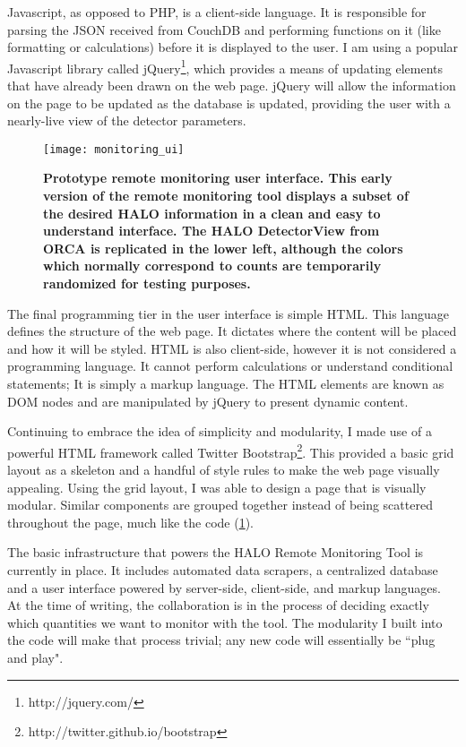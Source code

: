 		Javascript, as opposed to PHP, is a client-side language. It is responsible for parsing the JSON received from CouchDB and performing functions on it (like formatting or calculations) before it is displayed to the user. I am using a popular Javascript library called jQuery\footnote{http://jquery.com/}, which provides a means of updating elements that have already been drawn on the web page. jQuery will allow the information on the page to be updated as the database is updated, providing the user with a nearly-live view of the detector parameters. 

		\begin{figure}[H]
			\texttt{[image: monitoring\_ui]}
			\caption[Prototype Remote Monitoring User Interface]{\bf Prototype remote monitoring user interface. \rm This early version of the remote monitoring tool displays a subset of the desired HALO information in a clean and easy to understand interface. The HALO DetectorView from ORCA is replicated in the lower left, although the colors which normally correspond to counts are temporarily randomized for testing purposes.}
			\label{fig:mon_ui}
		\end{figure}

		The final programming tier in the user interface is simple HTML. This language defines the structure of the web page. It dictates where the content will be placed and how it will be styled. HTML is also client-side, however it is not considered a programming language. It cannot perform calculations or understand conditional statements; It is simply a markup language. The HTML elements are known as DOM nodes and are manipulated by jQuery to present dynamic content.

		Continuing to embrace the idea of simplicity and modularity, I made use of a powerful HTML framework called Twitter Bootstrap\footnote{http://twitter.github.io/bootstrap}. This provided a basic grid layout as a skeleton and a handful of style rules to make the web page visually appealing. Using the grid layout, I was able to design a page that is visually modular. Similar components are grouped together instead of being scattered throughout the page, much like the code (\FIG \ref{fig:mon_ui}). 

		The basic infrastructure that powers the HALO Remote Monitoring Tool is currently in place. It includes automated data scrapers, a centralized database and a user interface powered by server-side, client-side, and markup languages. At the time of writing, the collaboration is in the process of deciding exactly which quantities we want to monitor with the tool. The modularity I built into the code will make that process trivial; any new code will essentially be ``plug and play". 


